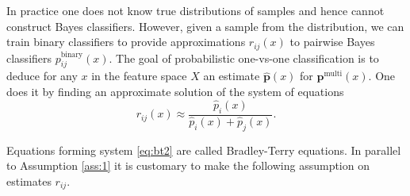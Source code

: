 In practice one does not  know true distributions of samples and hence cannot 
construct Bayes classifiers. However, given a sample from the distribution, 
we can train binary classifiers to provide approximations $r_{ij}(x)$ to 
pairwise Bayes classifiers $p_{ij}^\textrm{binary}(x)$. The goal of probabilistic
one-vs-one classification is to deduce for any $x$ in the feature space $X$ an 
estimate $\hat{\boldsymbol{p}}(x)$ for $\boldsymbol{p}^\textrm{multi}(x)$. 
One does it by finding an approximate solution of the system of equations
%
%
%
%
%
%
%
%
\begin{equation}
	{r}_{ij}(x) \approx \frac {\hat p_i(x)}{\hat p_i(x) + \hat p_j(x)}. \label{eq:bt2}
\end{equation}


Equations forming system \eqref{eq:bt2} are called Bradley-Terry equations. In parallel to Assumption \ref{ass:1} it is customary to make the following assumption on estimates $r_{ij}$.


